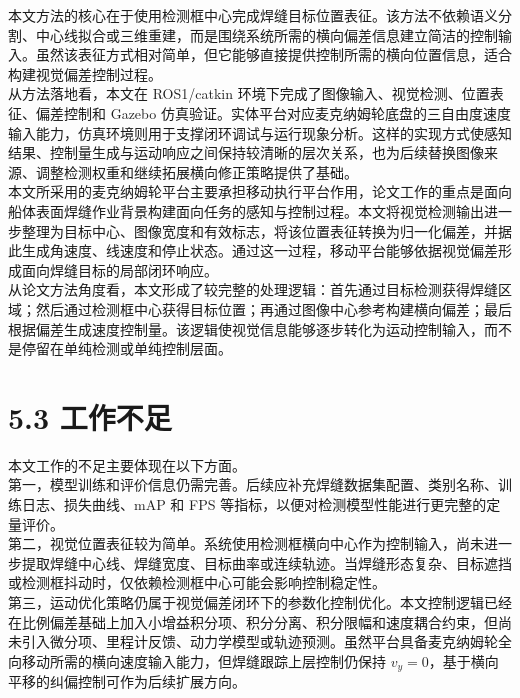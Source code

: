 \documentclass[UTF8,a4paper,12pt]{ctexrep}
\begin{document}
本文方法的核心在于使用检测框中心完成焊缝目标位置表征。该方法不依赖语义分割、中心线拟合或三维重建，而是围绕系统所需的横向偏差信息建立简洁的控制输入。虽然该表征方式相对简单，但它能够直接提供控制所需的横向位置信息，适合构建视觉偏差控制过程。\\

从方法落地看，本文在 ROS1/catkin 环境下完成了图像输入、视觉检测、位置表征、偏差控制和 Gazebo 仿真验证。实体平台对应麦克纳姆轮底盘的三自由度速度输入能力，仿真环境则用于支撑闭环调试与运行现象分析。这样的实现方式使感知结果、控制量生成与运动响应之间保持较清晰的层次关系，也为后续替换图像来源、调整检测权重和继续拓展横向修正策略提供了基础。\\

本文所采用的麦克纳姆轮平台主要承担移动执行平台作用，论文工作的重点是面向船体表面焊缝作业背景构建面向任务的感知与控制过程。本文将视觉检测输出进一步整理为目标中心、图像宽度和有效标志，将该位置表征转换为归一化偏差，并据此生成角速度、线速度和停止状态。通过这一过程，移动平台能够依据视觉偏差形成面向焊缝目标的局部闭环响应。\\

从论文方法角度看，本文形成了较完整的处理逻辑：首先通过目标检测获得焊缝区域；然后通过检测框中心获得目标位置；再通过图像中心参考构建横向偏差；最后根据偏差生成速度控制量。该逻辑使视觉信息能够逐步转化为运动控制输入，而不是停留在单纯检测或单纯控制层面。\\

\section{5.3 工作不足}

本文工作的不足主要体现在以下方面。\\

第一，模型训练和评价信息仍需完善。后续应补充焊缝数据集配置、类别名称、训练日志、损失曲线、mAP 和 FPS 等指标，以便对检测模型性能进行更完整的定量评价。\\

第二，视觉位置表征较为简单。系统使用检测框横向中心作为控制输入，尚未进一步提取焊缝中心线、焊缝宽度、目标曲率或连续轨迹。当焊缝形态复杂、目标遮挡或检测框抖动时，仅依赖检测框中心可能会影响控制稳定性。\\

第三，运动优化策略仍属于视觉偏差闭环下的参数化控制优化。本文控制逻辑已经在比例偏差基础上加入小增益积分项、积分分离、积分限幅和速度耦合约束，但尚未引入微分项、里程计反馈、动力学模型或轨迹预测。虽然平台具备麦克纳姆轮全向移动所需的横向速度输入能力，但焊缝跟踪上层控制仍保持 $v_y=0$，基于横向平移的纠偏控制可作为后续扩展方向。\\
\end{document}
